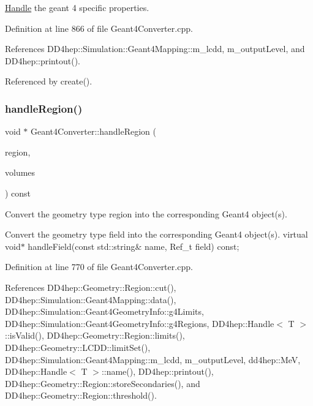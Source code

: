\hyperlink{class_d_d4hep_1_1_handle}{Handle} the geant 4 specific properties. 



Definition at line 866 of file Geant4\+Converter.\+cpp.



References D\+D4hep\+::\+Simulation\+::\+Geant4\+Mapping\+::m\+\_\+lcdd, m\+\_\+output\+Level, and D\+D4hep\+::printout().



Referenced by create().

\hypertarget{class_d_d4hep_1_1_simulation_1_1_geant4_converter_a062aad41974418b4047a9689ac0bfca4}{}\label{class_d_d4hep_1_1_simulation_1_1_geant4_converter_a062aad41974418b4047a9689ac0bfca4} 
\subsubsection{\texorpdfstring{handle\+Region()}{handleRegion()}}
{\footnotesize\ttfamily void $\ast$ Geant4\+Converter\+::handle\+Region (\begin{DoxyParamCaption}\item[{\hyperlink{class_d_d4hep_1_1_simulation_1_1_geant4_mapping_a48f9337eb1105d5874835c20456a652d}{Region}}]{region,  }\item[{const std\+::set$<$ const T\+Geo\+Volume $\ast$$>$ \&}]{volumes }\end{DoxyParamCaption}) const\hspace{0.3cm}{\ttfamily [virtual]}}



Convert the geometry type region into the corresponding Geant4 object(s). 

Convert the geometry type field into the corresponding Geant4 object(s). virtual void$\ast$ handle\+Field(const std\+::string\& name, Ref\+\_\+t field) const; 

Definition at line 770 of file Geant4\+Converter.\+cpp.



References D\+D4hep\+::\+Geometry\+::\+Region\+::cut(), D\+D4hep\+::\+Simulation\+::\+Geant4\+Mapping\+::data(), D\+D4hep\+::\+Simulation\+::\+Geant4\+Geometry\+Info\+::g4\+Limits, D\+D4hep\+::\+Simulation\+::\+Geant4\+Geometry\+Info\+::g4\+Regions, D\+D4hep\+::\+Handle$<$ T $>$\+::is\+Valid(), D\+D4hep\+::\+Geometry\+::\+Region\+::limits(), D\+D4hep\+::\+Geometry\+::\+L\+C\+D\+D\+::limit\+Set(), D\+D4hep\+::\+Simulation\+::\+Geant4\+Mapping\+::m\+\_\+lcdd, m\+\_\+output\+Level, dd4hep\+::\+MeV, D\+D4hep\+::\+Handle$<$ T $>$\+::name(), D\+D4hep\+::printout(), D\+D4hep\+::\+Geometry\+::\+Region\+::store\+Secondaries(), and D\+D4hep\+::\+Geometry\+::\+Region\+::threshold().



